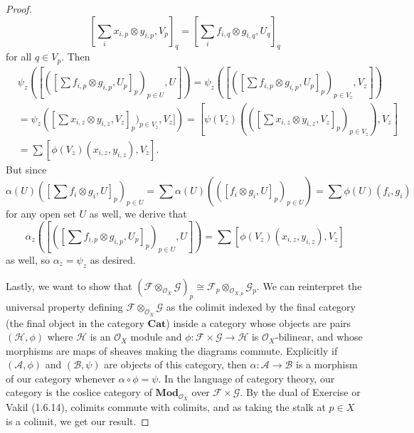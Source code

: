 \documentclass{article}
\newcommand{\fA}{\mathscr{A}}
\newcommand{\fB}{\mathscr{B}}
\newcommand{\fO}{\mathscr{O}}
\newcommand{\fF}{\mathscr{F}}
\newcommand{\fG}{\mathscr{G}}
\newcommand{\fH}{\mathscr{H}}
\newcommand{\Mod}{\mathbf{Mod}} %
\newcommand{\Cat}{\mathbf{Cat}} %
\begin{document}
\begin{proof}
    \[
    [\sum_i x_{i,p}\otimes y_{i,p}, V_p]_q=[\sum_i f_{i,q}\otimes g_{i,q},U_q]_q
    \]
    for all $q\in V_p$. Then
    \begin{align*}
        &\psi_z\left([([\sum f_{i,p}\otimes g_{i,p},U_p]_p)_{p\in U},U]\right)= \psi_z\left([([\sum f_{i,p}\otimes g_{i,p},U_p]_p)_{p\in V_z},V_z]\right)\\
        &=\psi_z\left([\sum x_{i,z}\otimes y_{i,z}, V_z]_p)_{p\in V_z},V_z]\right)=[\psi(V_z)\left(([\sum x_{i,z}\otimes y_{i,z}, V_z]_p)_{p\in V_z}\right),V_z]\\
        &= \sum[ \phi(V_z)(x_{i,z}, y_{i,z}), V_z].
    \end{align*}
    But since
    \[
     \alpha(U)([\sum f_i\otimes g_i, U]_p)_{p\in U}=\sum \alpha(U)\left(([f_i\otimes g_i, U]_p)_{p\in U}\right)=\sum \phi(U)(f_i,g_i)
    \]
    for any open set $U$ as well, we derive that 
    \[
    \alpha_z\left([([\sum f_{i,p}\otimes g_{i,p},U_p]_p)_{p\in U},U]\right)=\sum[ \phi(V_z)(x_{i,z}, y_{i,z}), V_z]
    \]
    as well, so $\alpha_z=\psi_z$ as desired.
    
    Lastly, we want to show that $(\fF \otimes_{\fO_X} \fG)_p \cong \fF_p \otimes_{\fO_{X,p}} \fG_p$. We can reinterpret the universal property defining $\fF \otimes_{\fO_X} \fG$ as the colimit indexed by the final category (the final object in the category $\Cat$) inside a category whose objects are pairs $(\fH, \phi)$ where $\fH$ is an $\fO_X$ module and $\phi:\fF\times \fG \to \fH$ is $\fO_X$-bilinear, and whose morphisms are maps of sheaves making the diagrams commute. Explicitly if $(\fA, \phi)$ and $(\fB, \psi)$ are objects of this category, then $\alpha:\fA \to \fB$ is a morphism of our category whenever $\alpha \circ \phi = \psi$. In the language of category theory, our category is the coslice category of  $\Mod_{\fO_X}$ over $\fF\times \fG$. By the dual of Exercise %
     or Vakil (1.6.14), colimits commute with colimits, and as taking the stalk at $p\in X$ is a colimit, we get our result.
\end{proof}
\subsection{}
\end{document}
